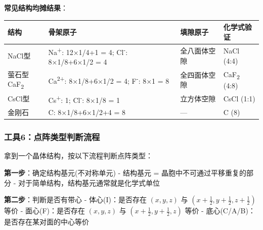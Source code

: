 \documentclass[a4paper,11pt]{ctexart}
\newcounter{none}
\newcommand{\箭}{\ensuremath{\rightarrow}}
\newcommand{\左箭}{\ensuremath{\leftarrow}}
\newcommand{\上箭}{\ensuremath{\uparrow}}
\newcommand{\下箭}{\ensuremath{\downarrow}}
\newcommand{\衡}{\ensuremath{\rightleftharpoons}}
\newcommand{\双箭}{\ensuremath{\leftrightarrow}}
\newcommand{\约等于}{\ensuremath{\approx}}
\newcommand{\小于等于}{\ensuremath{\leq}}
\newcommand{\大于等于}{\ensuremath{\geq}}
\newcommand{\不等于}{\ensuremath{\neq}}
\newcommand{\西格马}{\ensuremath{\sigma}}
\newcommand{\派}{\ensuremath{\pi}}
\begin{document}
\textbf{常见结构均摊结果}：

{\def\LTcaptype{none} %
\begin{longtable}[]{@{}
  >{\raggedright\arraybackslash}p{}
  >{\raggedright\arraybackslash}p{}
  >{\raggedright\arraybackslash}p{}
  >{\raggedright\arraybackslash}p{}@{}}
\toprule\noalign{}
\begin{minipage}[b]{\linewidth}\raggedright
结构
\end{minipage} & \begin{minipage}[b]{\linewidth}\raggedright
骨架原子
\end{minipage} & \begin{minipage}[b]{\linewidth}\raggedright
填隙原子
\end{minipage} & \begin{minipage}[b]{\linewidth}\raggedright
化学式验证
\end{minipage} \\
\midrule\noalign{}
\endhead
\bottomrule\noalign{}
\endlastfoot
NaCl型 & Na\textsuperscript{+}: 12×1/4+1 = 4; Cl\textsuperscript{-}: 8×1/8+6×1/2 = 4 & 全八面体空隙 & NaCl (4:4) \\
萤石型CaF\textsubscript{2} & Ca\textsuperscript{2+}: 8×1/8+6×1/2 = 4; F\textsuperscript{-}: 8×1 = 8 & 全四面体空隙 & CaF\textsubscript{2} (4:8) \\
CsCl型 & Cs\textsuperscript{+}: 1; Cl\textsuperscript{-}: 8×1/8 = 1 & 立方体空隙 & CsCl (1:1) \\
金刚石 & C: 8×1/8+6×1/2+4 = 8 & --- & C (8) \\
\end{longtable}
}

\subsubsection{工具6：点阵类型判断流程}\label{ux5de5ux51776ux70b9ux9635ux7c7bux578bux5224ux65adux6d41ux7a0b}

拿到一个晶体结构，按以下流程判断点阵类型：

\textbf{第一步}：确定结构基元(不对称单元)
- 结构基元 = 晶胞中不可通过平移重复的部分
- 对于简单结构，结构基元通常就是化学式单位

\textbf{第二步}：判断是否有带心
- 体心(I)：是否存在 \((x,y,z)\) 与 \((x+\frac{1}{2}, y+\frac{1}{2}, z+\frac{1}{2})\) 等价
- 面心(F)：是否存在 \((x,y,z)\) 与 \((x+\frac{1}{2}, y+\frac{1}{2}, z)\) 等价
- 底心(C/A/B)：是否存在某对面的中心等价
\end{document}

